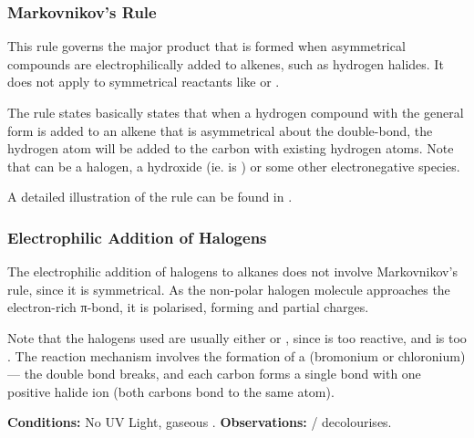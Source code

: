 

		\subsubsection{Markovnikov's Rule}

			This rule governs the major product that is formed when asymmetrical compounds are electrophilically added to alkenes,
			such as hydrogen halides. It does not apply to symmetrical reactants like  or .

			The rule states basically states that when a hydrogen compound with the general form  is added to an
			alkene that is asymmetrical about the double-bond, the hydrogen atom will be added to the carbon with 
			existing hydrogen atoms. Note that  can be a halogen, a hydroxide (ie.  is ) or some other
			electronegative species.

			A detailed illustration of the rule can be found in \hyperlink{AppendixMarkovnikovsRuleIllustration}{}.






		\pagebreak
		\subsubsection{Electrophilic Addition of Halogens}

			The electrophilic addition of halogens to alkanes does not involve Markovnikov's rule, since it is symmetrical.
			As the non-polar halogen molecule approaches the electron-rich π-bond, it is polarised, forming \deltap{} and \deltam{} partial
			charges.

			Note that the halogens used are usually either  or , since  is too reactive, and
			 is too . The reaction mechanism involves the formation of a 
			(bromonium or chloronium) --- the double bond breaks, and each carbon forms a single bond with one positive halide ion
			(both carbons bond to the same atom).

			\vspace{1.5em}

			\vbox{\textbf{Conditions:}	\tabto{35mm}No UV Light, gaseous .}
			\vbox{\textbf{Observations:}\tabto{35mm}  /   decolourises.}

